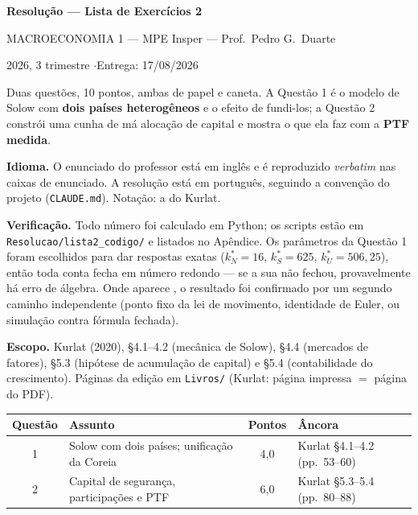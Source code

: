 \documentclass[11pt, a4paper]{article}
\newcommand{\stst}{^{\ast}}
\begin{document}
\begin{center}
{\LARGE\bfseries\color{darkblue} Resolução --- Lista de Exercícios 2\par}
\vspace{4pt}
{\large MACROECONOMIA 1 --- MPE Insper --- Prof.\ Pedro G.\ Duarte\par}
\vspace{2pt}
{\normalsize 2026, 3\textordmasculine{} trimestre \quad$\cdot$\quad Entrega: 17/08/2026\par}
\end{center}
\vspace{6pt}

\begin{tcolorbox}[theorybox, title={Como ler este documento}]
\small
Duas questões, 10 pontos, ambas de papel e caneta. A Questão 1 é o modelo de Solow com
\textbf{dois países heterogêneos} e o efeito de fundi-los; a Questão 2 constrói uma cunha
de má alocação de capital e mostra o que ela faz com a \textbf{PTF medida}.

\smallskip
\textbf{Idioma.} O enunciado do professor está em inglês e é reproduzido \emph{verbatim} nas
caixas de enunciado. A resolução está em português, seguindo a convenção do projeto
(\texttt{CLAUDE.md}). Notação: a do Kurlat.

\smallskip
\textbf{Verificação.} Todo número foi calculado em Python; os scripts estão em
\texttt{Resolucao/lista2\_codigo/} e listados no Apêndice. Os parâmetros da Questão 1 foram
escolhidos para dar respostas exatas ($k\stst_N = 16$, $k\stst_S = 625$,
$k\stst_U = 506{,}25$), então toda conta fecha em número redondo --- se a sua não fechou,
provavelmente há erro de álgebra. Onde aparece \checkmark, o resultado foi confirmado por
um segundo caminho independente (ponto fixo da lei de movimento, identidade de Euler,
ou simulação contra fórmula fechada).

\smallskip
\textbf{Escopo.} Kurlat (2020), §4.1--4.2 (mecânica de Solow), §4.4 (mercados de fatores),
§5.3 (hipótese de acumulação de capital) e §5.4 (contabilidade do crescimento). Páginas da
edição em \texttt{Livros/} (Kurlat: página impressa $=$ página do PDF).
\end{tcolorbox}

\vspace{4pt}
\begin{center}
\small
\begin{tabular}{clcl}
\toprule
\textbf{Questão} & \textbf{Assunto} & \textbf{Pontos} & \textbf{Âncora} \\
\midrule
1 & Solow com dois países; unificação da Coreia & 4,0 & Kurlat §4.1--4.2 (pp.\ 53--60) \\
2 & Capital de segurança, participações e PTF   & 6,0 & Kurlat §5.3--5.4 (pp.\ 80--88) \\
\bottomrule
\end{tabular}
\end{center}
\end{document}
